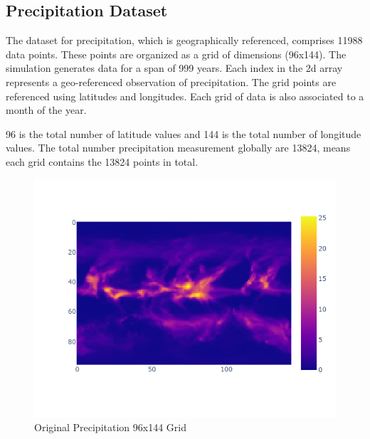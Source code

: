 \subsection{Precipitation Dataset}

The dataset for precipitation, which is geographically referenced, comprises 11988 data points. These points are organized as a grid of dimensions (96x144). The simulation generates data for a span of 999 years. Each index in the 2d array represents a geo-referenced observation of precipitation. The grid points are referenced using latitudes and longitudes.
Each grid of data is also associated to a month of the year.

96 is the total number of latitude values and 144 is the total number of longitude values. The total number precipitation measurement globally are 13824, means each grid contains the 13824 points in total.

\begin{figure}[H]
    \centering
    \includegraphics[width=0.6\linewidth]{figures/chapter-5/precipitation_raster.png}
    \caption{Original Precipitation 96x144 Grid }
    \label{fig:org_geopoth}
\end{figure}